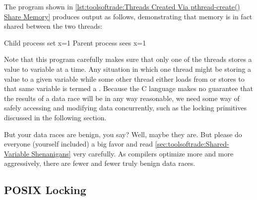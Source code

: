The program shown in
\cref{lst:toolsoftrade:Threads Created Via pthread-create() Share Memory}
produces output as follows, demonstrating that memory is in fact
shared between the two threads:

\begin{VerbatimU}
Child process set x=1
Parent process sees x=1
\end{VerbatimU}

Note that this program carefully makes sure that only one of the threads
stores a value to variable  at a time.
Any situation in which one thread might be storing a value to a given
variable while some other thread either loads from or stores to that
same variable is termed a \emph{}.
Because the C language makes no guarantee that the results of a data race
will be in any way reasonable, we need some way of safely accessing
and modifying data concurrently, such as the locking primitives discussed
in the following section.

But your data races are benign, you say?
Well, maybe they are.
But please do everyone (yourself included) a big favor and read
\cref{sec:toolsoftrade:Shared-Variable Shenanigans}
very carefully.
As compilers optimize more and more aggressively, there are fewer and
fewer truly benign data races.

\QuickQuizEnd

\subsection{POSIX Locking}
\label{sec:toolsoftrade:POSIX Locking}

